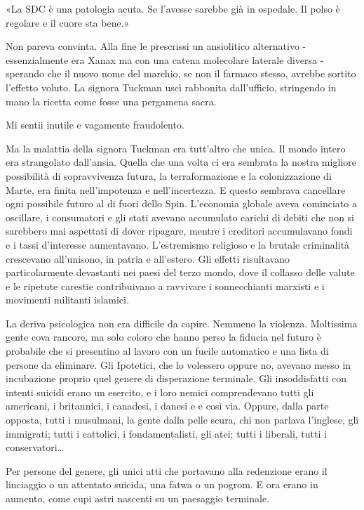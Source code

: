 «La SDC è una patologia acuta. Se l'avesse sarebbe già in ospedale. Il
polso è regolare e il cuore sta bene.»

Non pareva convinta. Alla fine le prescrissi un ansiolitico alternativo
- essenzialmente era Xanax ma con una catena molecolare laterale diversa
- sperando che il nuovo nome del marchio, se non il farmaco stesso,
avrebbe sortito l'effetto voluto. La signora Tuckman uscì rabbonita
dall'ufficio, stringendo in mano la ricetta come fosse una pergamena
sacra.

Mi sentii inutile e vagamente fraudolento.

Ma la malattia della signora Tuckman era tutt'altro che unica. Il mondo
intero era strangolato dall'ansia. Quella che una volta ci era sembrata
la nostra migliore possibilità di sopravvivenza futura, la
terraformazione e la colonizzazione di Marte, era finita nell'impotenza
e nell'incertezza. E questo sembrava cancellare ogni possibile futuro al
di fuori dello Spin. L'economia globale aveva cominciato a oscillare, i
consumatori e gli stati avevano accumulato carichi di debiti che non si
sarebbero mai aspettati di dover ripagare, mentre i creditori
accumulavano fondi e i tassi d'interesse aumentavano. L'estremismo
religioso e la brutale criminalità crescevano all'unisono, in patria e
all'estero. Gli effetti risultavano particolarmente devastanti nei paesi
del terzo mondo, dove il collasso delle valute e le ripetute carestie
contribuivano a ravvivare i sonnecchianti marxisti e i movimenti
militanti islamici.

La deriva psicologica non era difficile da capire. Nemmeno la violenza.
Moltissima gente cova rancore, ma solo coloro che hanno perso la fiducia
nel futuro è probabile che si presentino al lavoro con un fucile
automatico e una lista di persone da eliminare. Gli Ipotetici, che lo
volessero oppure no, avevano messo in incubazione proprio quel genere di
disperazione terminale. Gli insoddisfatti con intenti suicidi erano un
esercito, e i loro nemici comprendevano tutti gli americani, i
britannici, i canadesi, i danesi e e così via. Oppure, dalla parte
opposta, tutti i musulmani, la gente dalla pelle scura, chi non parlava
l'inglese, gli immigrati; tutti i cattolici, i fondamentalisti, gli
atei; tutti i liberali, tutti i conservatori\ldots{}

Per persone del genere, gli unici atti che portavano alla redenzione
erano il linciaggio o un attentato suicida, una fatwa o un pogrom. E ora
erano in aumento, come cupi astri nascenti su un paesaggio terminale.

